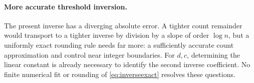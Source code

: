 \paragraph{More accurate threshold inversion.}
The present inverse has a diverging absolute error. A tighter count remainder would transport to a tighter inverse by division by a slope of order $\log n$, but a uniformly exact rounding rule needs far more: a sufficiently accurate count approximation and control near integer boundaries. For $d,c$, determining the linear constant is already necessary to identify the second inverse coefficient. No finite numerical fit or rounding of \eqref{eq:inverseexact} resolves these questions.
